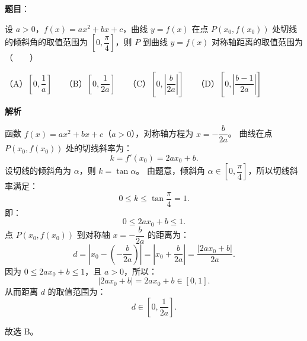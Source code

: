 \begin{answer}

\textbf{题目}：

设 $a > 0$，$f(x) = ax^2 + bx + c$，曲线 $y = f(x)$ 在点 $P(x_0, f(x_0))$ 处切线的倾斜角的取值范围为 $\left[0, \dfrac{\pi}{4}\right]$，则 $P$ 到曲线 $y = f(x)$ 对称轴距离的取值范围为\mbox{（　　）}

（A）$\left[0, \dfrac{1}{a}\right]$　　（B）$\left[0, \dfrac{1}{2a}\right]$　　（C）$\left[0, \left|\dfrac{b}{2a}\right|\right]$　　（D）$\left[0, \left|\dfrac{b-1}{2a}\right|\right]$

\textbf{解析}

函数 $f(x) = ax^2 + bx + c$（$a > 0$），对称轴方程为 $x = -\dfrac{b}{2a}$。
曲线在点 $P(x_0, f(x_0))$ 处的切线斜率为：
\nopagebreak[4]
\[k = f'(x_0) = 2ax_0 + b.\]
设切线的倾斜角为 $\alpha$，则 $k = \tan\alpha$。
由题意，倾斜角 $\alpha \in \left[0, \dfrac{\pi}{4}\right]$，所以切线斜率满足：
\nopagebreak[4]
\[0 \le k \le \tan\frac{\pi}{4} = 1.\]
即：
\nopagebreak[4]
\[0 \le 2ax_0 + b \le 1.\]
点 $P(x_0, f(x_0))$ 到对称轴 $x = -\dfrac{b}{2a}$ 的距离为：
\nopagebreak[4]
\[d = \left|x_0 - \left(-\frac{b}{2a}\right)\right| = \left|x_0 + \frac{b}{2a}\right| = \frac{|2ax_0 + b|}{2a}.\]
因为 $0 \le 2ax_0 + b \le 1$，且 $a > 0$，所以：
\nopagebreak[4]
\[|2ax_0 + b| = 2ax_0 + b \in [0, 1].\]
从而距离 $d$ 的取值范围为：
\nopagebreak[4]
\[d \in \left[0, \frac{1}{2a}\right].\]

故选 B。


\end{answer}
